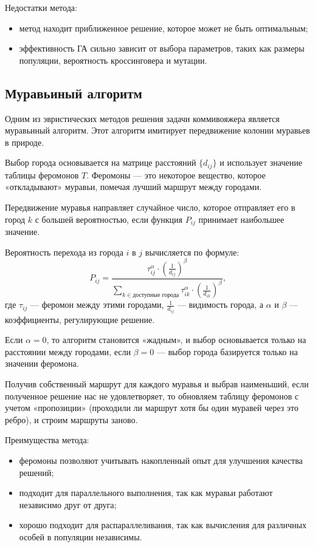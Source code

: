Недостатки метода:
\begin{itemize}[label=---]
    \item метод находит приближенное решение, которое может не быть оптимальным;
    \item эффективность ГА сильно зависит от выбора параметров, таких как размеры популяции, вероятность кроссинговера и мутации.
\end{itemize}

\subsection{Муравьиный алгоритм}
Одним из эвристических методов решения задачи коммивояжера является муравьиный алгоритм. Этот алгоритм имитирует передвижение колонии муравьев в природе.

Выбор города основывается на матрице расстояний \(\{d_{ij}\}\) и использует значение таблицы феромонов \(T\). Феромоны — это некоторое вещество, которое «откладывают» муравьи, помечая лучший маршрут между городами.

Передвижение муравья направляет случайное число, которое отправляет его в город \(k\) с большей вероятностью, если функция \(P_{ij}\) принимает наибольшее значение. 

Вероятность перехода из города \(i\) в \(j\) вычисляется по формуле:
\begin{equation}
P_{ij} = \frac{\tau_{ij}^\alpha \cdot \left( \frac{1}{d_{ij}} \right)^\beta}{\sum_{k \in \text{доступные города}} \tau_{ik}^\alpha \cdot \left( \frac{1}{d_{ik}} \right)^\beta},
\end{equation}
где \(\tau_{ij}\) — феромон между этими городами, \(\frac{1}{d_{ij}}\) — видимость города, а \(\alpha\) и \(\beta\) — коэффициенты, регулирующие решение. 

Если \(\alpha = 0\), то алгоритм становится «жадным», и выбор основывается только на расстоянии между городами, если \(\beta = 0\) — выбор города базируется только на значении феромона.

Получив собственный маршрут для каждого муравья и выбрав наименьший, если полученное решение нас не удовлетворяет, то обновляем таблицу феромонов с учетом «пропозиции» (проходили ли маршрут хотя бы один муравей через это ребро), и строим маршруты заново.

Преимущества метода:
\begin{itemize}[label=---]
    \item феромоны позволяют учитывать накопленный опыт для улучшения качества решений;
    \item подходит для параллельного выполнения, так как муравьи работают независимо друг от друга;
    \item хорошо подходит для распараллеливания, так как вычисления для различных особей в популяции независимы.
\end{itemize}

